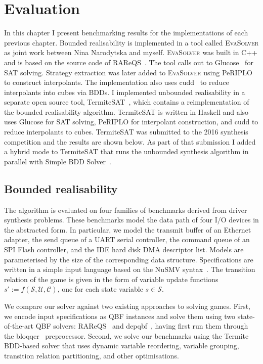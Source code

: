 \chapter{Evaluation}
\label{ch:evaluation}

\newcommand{\eva}[0]{\textsc{EvaSolver}\xspace}

In this chapter I present benchmarking results for the implementations of each previous chapter. Bounded realisability is implemented in a tool called \eva as joint work between Nina Narodytska and myself. \eva was built in C++ and is based on the source code of RAReQS~\cite{Janota12}. The tool calls out to Glucose~\cite{Audemard09} for SAT solving. Strategy extraction was later added to \eva using PeRIPLO~\cite{Rollini13} to construct interpolants. The implementation also uses cudd~\cite{Somenzi01} to reduce interpolants into cubes via BDDs. I implemented unbounded realisability in a separate open source tool, TermiteSAT~\cite{TermiteSAT}, which contains a reimplementation of the bounded realisability algorithm. TermiteSAT is written in Haskell and also uses Glucose for SAT solving, PeRIPLO for interpolant construction, and cudd to reduce interpolants to cubes. TermiteSAT was submitted to the 2016 synthesis competition and the results are shown below. As part of that submission I added a hybrid mode to TermiteSAT that runs the unbounded synthesis algorithm in parallel with Simple BDD Solver~\cite{Walker14b}.

\section{Bounded realisability}

The algorithm is evaluated on four families of benchmarks derived from driver synthesis problems.  These benchmarks model the data path of four I/O devices in the abstracted form.  In particular, we model the transmit buffer of an Ethernet adapter, the send queue of a UART serial controller, the command queue of an SPI Flash controller, and the IDE hard disk DMA descriptor list.   Models are parameterised by the size of the corresponding data structure.  Specifications are written in a simple input language based on the NuSMV syntax~\cite{Henzinger03}.   The transition relation of the game is given in the form of variable update functions $s' := f(\mathcal{S}, \mathcal{U}, \mathcal{C})$, one for each state variable $s \in \mathcal{S}$.

We compare our solver against two existing approaches to solving games.  First, we encode input specifications as QBF instances and solve them using two state-of-the-art QBF solvers: RAReQS~\cite{Janota12} and depqbf~\cite{Lonsing10}, having first run them through the bloqqer~\cite{Biere11} preprocessor.  Second, we solve our benchmarks using the Termite~\cite{Walker14} BDD-based solver that uses dynamic variable reordering, variable grouping, transition relation partitioning, and other optimisations. 

